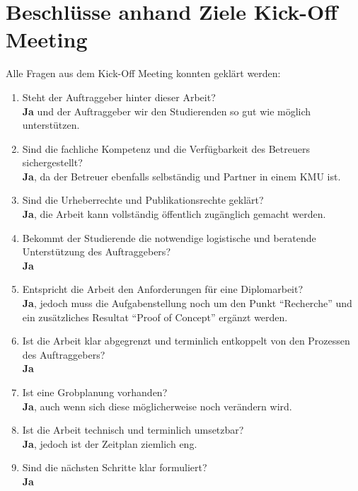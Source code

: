 \documentclass[]{scrreprt}
\begin{document}
    \section{Beschlüsse anhand Ziele Kick-Off Meeting}
    Alle Fragen aus dem Kick-Off Meeting konnten geklärt werden:
    \begin{enumerate}
        \item Steht der Auftraggeber hinter dieser Arbeit? \\
            {\bf Ja} und der Auftraggeber wir den Studierenden so gut wie
            möglich unterstützen.
        \item Sind die fachliche Kompetenz und die Verfügbarkeit des Betreuers 
            sichergestellt? \\
            {\bf Ja}, da der Betreuer ebenfalls selbständig und Partner in 
            einem KMU ist.
        \item Sind die Urheberrechte und Publikationsrechte geklärt? \\
            {\bf Ja}, die Arbeit kann vollständig öffentlich zugänglich gemacht
            werden.
        \item Bekommt der Studierende die notwendige logistische und beratende 
            Unterstützung des Auftraggebers? \\
            {\bf Ja}
        \item Entspricht die Arbeit den Anforderungen für eine Diplomarbeit? \\
            {\bf Ja}, jedoch muss die Aufgabenstellung noch um den Punkt 
            ``Recherche'' und ein zusätzliches Resultat ``Proof of Concept'' 
            ergänzt werden.
        \item Ist die Arbeit klar abgegrenzt und terminlich entkoppelt von den 
            Prozessen des Auftraggebers? \\
            {\bf Ja}
        \item Ist eine Grobplanung vorhanden? \\
            {\bf Ja}, auch wenn sich diese möglicherweise noch verändern wird.
        \item Ist die Arbeit technisch und terminlich umsetzbar? \\
            {\bf Ja}, jedoch ist der Zeitplan ziemlich eng.
        \item Sind die nächsten Schritte klar formuliert? \\
            {\bf Ja}
    \end{enumerate}
    
\end{document}
